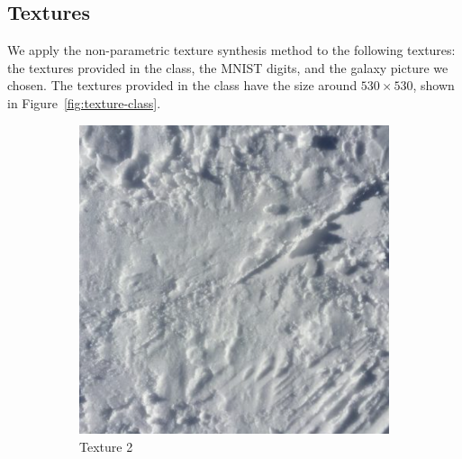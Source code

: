 \documentclass{article}
\begin{document}
\subsection{Textures}

We apply the non-parametric texture synthesis method to the following textures: the textures provided in the class, the MNIST digits, and the galaxy picture we chosen. 
The textures provided in the class have the size around $530 \times 530$, shown in Figure~\ref{fig:texture-class}.

\begin{figure}[htbp!]
    \centering
    \begin{subfigure}[b]{0.32\textwidth}
        \includegraphics[width=\textwidth]{../Code/Textures/2.png}
        \caption{Texture 2}
        \label{fig:texture-2}
    \end{subfigure}
    \hfill %
    \begin{subfigure}[b]{0.32\textwidth}

\end{subfigure}
\end{figure}
\end{document}
